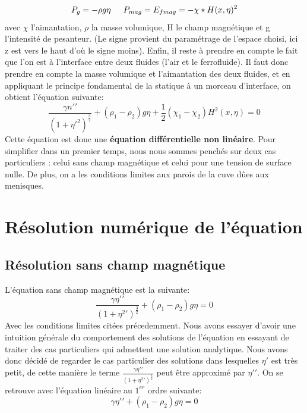 \documentclass[10pt,a4paper]{article}
\begin{document}
\begin{equation}
P_{g} = -\rho g\eta \indent
P_{mag}=E_{fmag}=-\chi*H(x,\eta)^2
\end{equation}
avec $\chi$ l'aimantation, $\rho$ la masse volumique, H le champ magnétique et g l'intensité de pesanteur.
(Le signe provient du paramétrage de l'espace choisi, ici z est vers le haut d'où le signe moins).
\newline
\newline
Enfin, il reste à prendre en compte le fait que l'on est à l'interface entre deux fluides (l'air et le ferrofluide). Il faut donc prendre en compte la masse volumique et l'aimantation des deux fluides, et en appliquant le principe fondamental de la statique à un morceau d'interface, on obtient l'équation suivante:
\begin{equation}
\frac{\gamma n\prime\prime}{(1+\eta\prime^2)^{\frac{3}{2}}} + (\rho_{1} - \rho_{2})g\eta + \frac{1}{2}(\chi_{1} - \chi_{2})H^{2}(x,\eta)=0
\end{equation}
Cette équation est donc une \textbf{équation différentielle non linéaire}. Pour simplifier dans un premier temps, nous nous sommes penchés sur deux cas particuliers : celui sans champ magnétique et celui pour une tension de surface nulle. De plus, on a les conditions limites aux parois de la cuve dûes aux menisques.
\section{Résolution numérique de l'équation}
\subsection{Résolution sans champ magnétique}
L'équation sans champ magnétique est la suivante:
\begin{equation}
\frac{\gamma \eta\prime\prime}{(1+\eta^{2}\prime)^{\frac{3}{2}}} + (\rho_{1} - \rho_{2})g\eta =0
\label{eq09}
\end{equation}
Avec les conditions limites citées précedemment.
\newline
\newline
Nous avons essayer d'avoir une intuition générale du comportement des solutions de l'équation en essayant de traiter des cas particuliers qui admettent une solution analytique. Nous avons donc décidé de regarder le cas particulier des solutions dans lesquelles $\eta\prime$ est très petit, de cette manière le terme $\frac{\gamma \eta\prime\prime}{(1+\eta^{2}\prime)^{\frac{3}{2}}}$ peut être approximé par $\eta\prime\prime$.
\newline
On se retrouve avec l'équation linéaire au $1^{er}$ ordre suivante:
\begin{equation}
\gamma \eta\prime\prime + (\rho_{1} - \rho_{2})g\eta =0
\label{eq10}
\end{equation}
\end{document}
